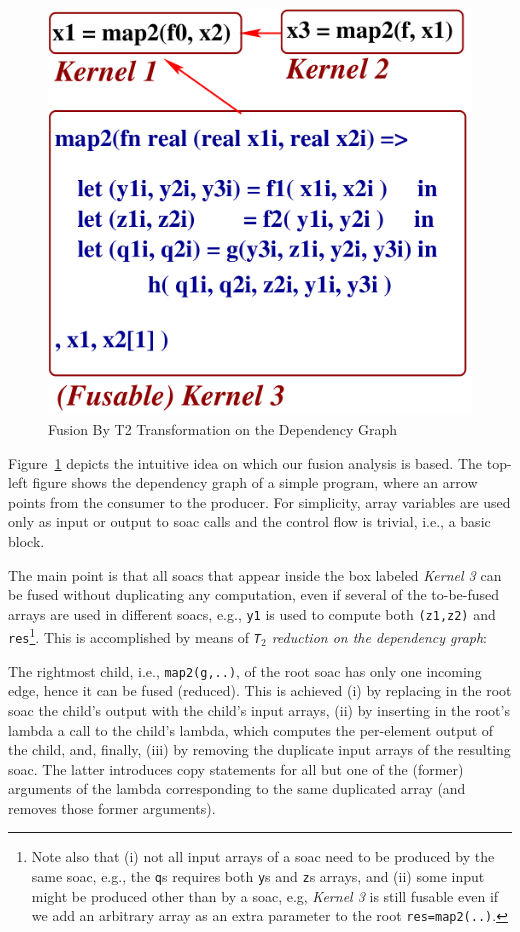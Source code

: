 \documentclass{sigplanconf}  %
\newcommand{\emp}[1]{\textcolor{DikuRed}{ #1}}
\begin{document}
\begin{figure}[bt]
{\begin{minipage}{0.46\columnwidth}
\begin{center}
\includegraphics[height=30ex]{Figures/T1T2Fuse3}
\end{center}
\end{minipage}
}
\caption{Fusion By T2 Transformation on the Dependency Graph}
\label{fig:T1T2}
\end{figure}

Figure~\ref{fig:T1T2} depicts the intuitive idea on which
our fusion analysis is based.   The top-left figure shows
the dependency graph of a simple program, where an 
arrow points from the consumer to the producer. 
%
For simplicity, array variables are used only as input or 
output to {\sc soac} calls and the control flow is trivial,
i.e., a basic block. 

The main point is that all {\sc soac}s that appear inside the box
labeled \emp{\em Kernel 3} can be fused without duplicating any
computation, even if several of the to-be-fused 
arrays are used in different {\sc soac}s, e.g., {\tt y1} is used to
compute both {\tt (z1,z2)} and {\tt res}\footnote{
Note also that (i) not all input arrays of a {\sc soac} need to be produced
by the same {\sc soac}, e.g., the {\tt q}s requires both {\tt y}s and 
{\tt z}s arrays, and (ii) some input might be produced other than 
by a {\sc soac}, e.g, \emp{\em Kernel 3} is still fusable even if 
we add an arbitrary array as an extra parameter to the root {\tt res=map2(..)}. 
}. 
This is accomplished by means of {\em {\tt T$_2$} reduction on the dependency graph}:

The rightmost child, i.e., {\tt map2(g,..)}, of the root {\sc soac} 
has only one incoming edge, 
hence it can be fused (reduced). This is achieved  (i) by replacing in
the root {\sc soac} the child's output with the child's input arrays, 
(ii) by inserting in the root's lambda a call to the child's lambda,
which computes the per-element output of the child, %
and, finally, (iii) by removing the duplicate input arrays of the resulting {\sc soac}.
The latter introduces copy statements for all but one 
of the (former) arguments of the lambda corresponding to the same duplicated
array (and removes those former arguments).
\end{document}

